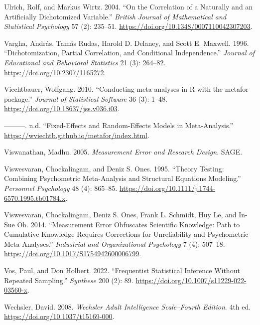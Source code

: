 \documentclass[
  letterpaper,
  DIV=11,
  numbers=noendperiod]{scrreprt}
\newlength{\cslhangindent}
\newlength{\cslentryspacingunit} %
\newenvironment{CSLReferences}[2] %
 {%
  \setlength{\parindent}{0pt}
  \ifodd #1
  \let\oldpar\par
  \def\par{\hangindent=\cslhangindent\oldpar}
  \fi
  \setlength{\parskip}{#2\cslentryspacingunit}
 }%
 {}
\begin{document}
\begin{CSLReferences}{1}{0}
\leavevmode{}%
Ulrich, Rolf, and Markus Wirtz. 2004. {``On the Correlation of a
Naturally and an Artificially Dichotomized Variable.''} \emph{British
Journal of Mathematical and Statistical Psychology} 57 (2): 235--51.
\url{https://doi.org/10.1348/0007110042307203}.

\leavevmode{}%
Vargha, András, Tamás Rudas, Harold D. Delaney, and Scott E. Maxwell.
1996. {``Dichotomization, Partial Correlation, and Conditional
Independence.''} \emph{Journal of Educational and Behavioral Statistics}
21 (3): 264--82. \url{https://doi.org/10.2307/1165272}.

\leavevmode{}%
Viechtbauer, Wolfgang. 2010. {``Conducting meta-analyses in R with the
metafor package.''} \emph{Journal of Statistical Software} 36 (3):
1--48. \url{https://doi.org/10.18637/jss.v036.i03}.

\leavevmode{}%
---------. n.d. {``Fixed-Effects and Random-Effects Models in
Meta-Analysis.''} \url{https://wviechtb.github.io/metafor/index.html}.

\leavevmode{}%
Viswanathan, Madhu. 2005. \emph{Measurement Error and Research Design}.
SAGE.

\leavevmode{}%
Viswesvaran, Chockalingam, and Deniz S. Ones. 1995. {``Theory Testing:
Combining Psychometric Meta-Analysis and Structural Equations
Modeling.''} \emph{Personnel Psychology} 48 (4): 865--85.
\url{https://doi.org/10.1111/j.1744-6570.1995.tb01784.x}.

\leavevmode{}%
Viswesvaran, Chockalingam, Deniz S. Ones, Frank L. Schmidt, Huy Le, and
In-Sue Oh. 2014. {``Measurement Error Obfuscates Scientific Knowledge:
Path to Cumulative Knowledge Requires Corrections for Unreliability and
Psychometric Meta-Analyses.''} \emph{Industrial and Organizational
Psychology} 7 (4): 507--18.
\url{https://doi.org/10.1017/S1754942600006799}.

\leavevmode{}%
Vos, Paul, and Don Holbert. 2022. {``Frequentist Statistical Inference
Without Repeated Sampling.''} \emph{Synthese} 200 (2): 89.
\url{https://doi.org/10.1007/s11229-022-03560-x}.

\leavevmode{}%
Wechsler, David. 2008. \emph{Wechsler Adult Intelligence Scale--Fourth
Edition}. 4th ed. \url{https://doi.org/10.1037/t15169-000}.


\end{CSLReferences}
\end{document}
